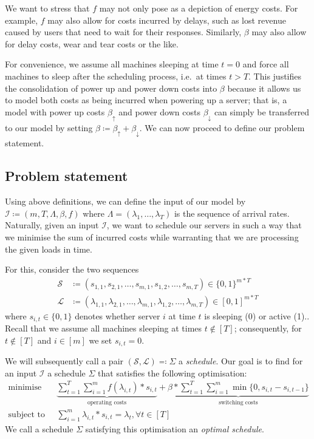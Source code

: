 \documentclass[hidelinks]{article}
\theoremstyle{plain}
\theoremstyle{definition}
\theoremstyle{rem}
\newcommand{\inp}{\mathcal{I}}
\begin{document}
We want to stress that $f$ may not only pose as a depiction of energy costs. For example, $f$ may also allow for costs incurred by delays, such as lost revenue caused by users that need to wait for their responses. Similarly, $\beta$ may also allow for delay costs, wear and tear costs or the like.\cite{dyn_right_size}

For convenience, we assume all machines sleeping at time $t=0$ and force all machines to sleep after the scheduling process, i.e.\ at times $t>T$. This justifies the consolidation of power up and power down costs into $\beta$ because it allows us to model both costs as being incurred when powering up a server; that is, a model with power up costs $\beta_\uparrow$ and power down costs $\beta_\downarrow$ can simply be transferred to our model by setting $\beta\coloneqq \beta_\uparrow+\beta_\downarrow$.  
We can now proceed to define our problem statement.

\subsection{Problem statement}
Using above definitions, we can define the input of our model by $\inp\coloneqq(m,T,\Lambda,\beta,f)$ where $\Lambda=(\lambda_1,\ldots,\lambda_T)$ is the sequence of arrival rates. Naturally, given an input $\inp$, we want to schedule our servers in such a way that we minimise the sum of incurred costs while warranting that we are processing the given loads in time. 

For this, consider the two sequences 
\begin{align*}
	\mathcal{S}&\coloneqq(s_{1,1},s_{2,1},\ldots,s_{m,1},s_{1,2},\ldots,s_{m,T})\in\{0,1\}^{m*T}\\
	\mathcal{L}&\coloneqq(\lambda_{1,1},\lambda_{2,1},\ldots,\lambda_{m,1},\lambda_{1,2},\ldots,\lambda_{m,T})\in[0,1]^{m*T}
\end{align*}
where $s_{i,t}\in\{0,1\}$ denotes whether server $i$ at time $t$ is sleeping (0) or active (1).. Recall that we assume all machines sleeping at times $t\notin[T]$; consequently, for $t\notin[T]$ and $i\in[m]$ we set $s_{i,t}=0$.

We will subsequently call a pair $(\mathcal{S},\mathcal{L})\eqqcolon\Sigma$ a \textit{schedule}. Our goal is to find for an input $\inp$ a schedule $\Sigma$ that satisfies the following optimisation:
\begin{align*}
	\text{minimise}\quad&\underbrace{\sum\limits_{t=1}^{T}\sum\limits_{i=1}^{m}f(\lambda_{i,t})*s_{i,t}}_{\text{operating costs}}+\underbrace{\beta*\sum\limits_{t=1}^{T}\sum\limits_{i=1}^{m}\min\{0,s_{i,t}-s_{i,t-1}\}}_{\text{switching costs}}
\\ 
	\text{subject to}\quad&\sum\limits_{i=1}^{m}\lambda_{i,t}*s_{i,t}=\lambda_t,\forall t\in[T]
\end{align*}
We call a schedule $\Sigma$ satisfying this optimisation an \textit{optimal schedule}.
\end{document}
